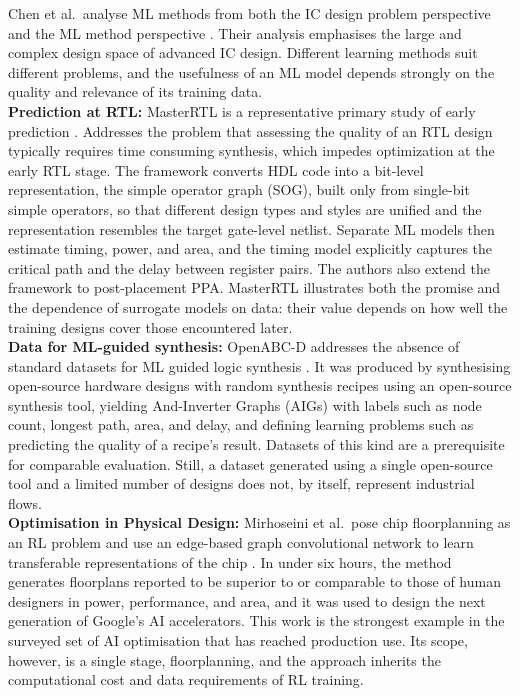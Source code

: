 \documentclass[conference]{IEEEtran}
\begin{document}
\noindent Chen et al.\ analyse ML methods from both the IC design problem perspective and the ML method perspective \cite{P2_Chen2023}. Their analysis emphasises the large and complex design space of advanced IC design. Different learning methods suit different problems, and the usefulness of an ML model depends strongly on the quality and relevance of its training data.\\

\noindent \textbf{Prediction at RTL:} MasterRTL is a representative primary study of early prediction \cite{P10_Fang2023}. Addresses the problem that assessing the quality of an RTL design typically requires time consuming synthesis, which impedes optimization at the early RTL stage. The framework converts HDL code into a bit-level representation, the simple operator graph (SOG), built only from single-bit simple operators, so that different design types and styles are unified and the representation resembles the target gate-level netlist. Separate ML models then estimate timing, power, and area, and the timing model explicitly captures the critical path and the delay between register pairs. The authors also extend the framework to post-placement PPA. MasterRTL illustrates both the promise and the dependence of surrogate models on data: their value depends on how well the training designs cover those encountered later.\\

\noindent \textbf{Data for ML-guided synthesis:} OpenABC-D addresses the absence of standard datasets for ML guided logic synthesis \cite{P9_Chowdhury2021}. It was produced by synthesising open-source hardware designs with random synthesis recipes using an open-source synthesis tool, yielding And-Inverter Graphs (AIGs) with labels such as node count, longest path, area, and delay, and defining learning problems such as predicting the quality of a recipe's result. Datasets of this kind are a prerequisite for comparable evaluation. Still, a dataset generated using a single open-source tool and a limited number of designs does not, by itself, represent industrial flows.\\

\noindent \textbf{Optimisation in Physical Design:} Mirhoseini et al.\ pose chip floorplanning as an RL problem and use an edge-based graph convolutional network to learn transferable representations of the chip \cite{P8_Mirhoseini2021}. In under six hours, the method generates floorplans reported to be superior to or comparable to those of human designers in power, performance, and area, and it was used to design the next generation of Google's AI accelerators. This work is the strongest example in the surveyed set of AI optimisation that has reached production use. Its scope, however, is a single stage, floorplanning, and the approach inherits the computational cost and data requirements of RL training.\\
\end{document}
